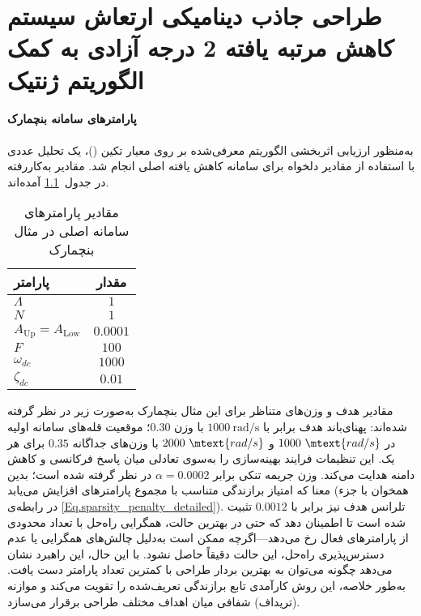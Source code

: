 \chapter{طراحی جاذب دینامیکی ارتعاش سیستم کاهش مرتبه یافته 2 درجه آزادی به کمک الگوریتم ژنتیک }
\subsubsection{پارامترهای سامانه بنچمارک}

به‌منظور ارزیابی اثربخشی الگوریتم  معرفی‌شده بر روی معیار تکین ()، یک تحلیل عددی با استفاده از مقادیر دلخواه برای سامانه کاهش یافته اصلی انجام شد. مقادیر به‌کاررفته در جدول~\ref{tab:benchmark-main-params} آمده‌اند.

\begin{table}[h!]
\centering
\caption{مقادیر پارامترهای سامانه اصلی در مثال بنچمارک}
\label{tab:benchmark-main-params}
\begin{tabular}{lc}
\hline
\textbf{پارامتر} & \textbf{مقدار} \\
\hline
$\Lambda$ & $1$ \\
$N$ & $1$ \\
$A_{\mathrm{Up}} = A_{\mathrm{Low}}$ & $0.0001$ \\
$F$ & $100$ \\
$\omega_{dc}$ & $1000$ \\
$\zeta_{dc}$ & $0.01$ \\
\hline
\end{tabular}
\end{table}

مقادیر هدف و وزن‌های متناظر برای این مثال بنچمارک به‌صورت زیر در نظر گرفته شده‌اند: پهنای‌باند هدف برابر با $1000~\text{rad/s}$ با وزن $0.30$؛ موقعیت قله‌های سامانه اولیه در $1000~\mtext{rad/s}$ و $2000~\mtext{rad/s}$ با وزن‌های جداگانه $0.35$ برای هر یک. این تنظیمات فرایند بهینه‌سازی را به‌سوی تعادلی میان پاسخ فرکانسی و کاهش دامنه هدایت می‌کند. وزن جریمه تنکی برابر $\alpha = 0.0002$ در نظر گرفته شده است؛ بدین معنا که امتیاز برازندگی متناسب با مجموع پارامترهای  افزایش می‌یابد (همخوان با جزء  در رابطه‌ی \eqref{Eq.sparsity_penalty_detailed}). تلرانس هدف نیز برابر با $0.0012$ تثبیت شده است تا اطمینان دهد که حتی در بهترین حالت، همگرایی راه‌حل با تعداد محدودی از پارامترهای  فعال رخ می‌دهد—اگرچه ممکن است به‌دلیل چالش‌های همگرایی یا عدم دسترس‌پذیری راه‌حل، این حالت دقیقاً حاصل نشود. با این حال، این راهبرد نشان می‌دهد چگونه می‌توان به بهترین بردار طراحی  با کمترین تعداد پارامتر دست یافت. به‌طور خلاصه، این روش کارآمدی تابع برازندگی تعریف‌شده را تقویت می‌کند و موازنه (تریداف) شفافی میان اهداف مختلف طراحی  برقرار می‌سازد.

